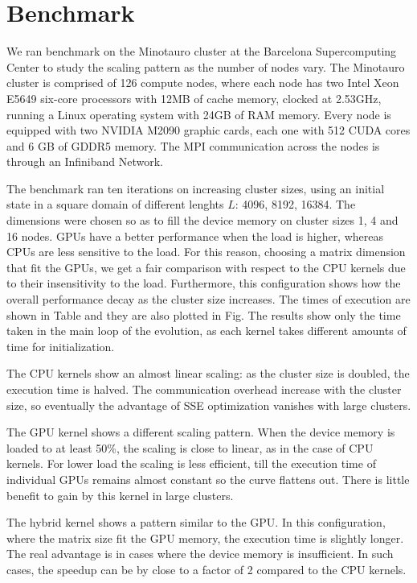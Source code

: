 \chapter{Benchmark}
We ran benchmark on the Minotauro cluster at the Barcelona Supercomputing Center to study the scaling pattern as the number of nodes vary. The Minotauro cluster is comprised of 126 compute nodes, where each node has two Intel Xeon E5649 six-core processors with 12MB of cache memory, clocked at 2.53GHz, running a Linux operating system with 24GB of RAM memory. Every node is equipped with two NVIDIA M2090 graphic cards, each one with 512 CUDA cores and 6 GB of GDDR5 memory. The MPI communication across the nodes is through an Infiniband Network. 

The benchmark ran ten iterations on increasing cluster sizes, using an initial state in a square domain of different lenghts $L$: 4096, 8192, 16384. The dimensions were chosen so as to fill the device memory on cluster sizes 1, 4 and 16 nodes. GPUs have a better performance when the load is higher, whereas CPUs are less sensitive to the load. For this reason, choosing a matrix dimension that fit the GPUs, we get a fair comparison with respect to the CPU kernels due to their insensitivity to the load. Furthermore, this configuration shows how the overall performance decay as the cluster size increases. The times of execution are shown in Table %
and they are also plotted in Fig. %
The results show only the time taken in the main loop of the evolution, as each kernel takes different amounts of time for initialization.

The CPU kernels show an almost linear scaling: as the cluster size is doubled, the execution time is halved. The communication overhead increase with the cluster size, so eventually the advantage of SSE optimization vanishes with large clusters.

The GPU kernel shows a different scaling pattern. When the device memory is loaded to at least 50\%, the scaling is close to linear, as in the case of CPU kernels. For lower load the scaling is less efficient, till the execution time of individual GPUs remains almost constant so the curve flattens out. There is little benefit to gain by this kernel in large clusters.

The hybrid kernel shows a pattern similar to the GPU. In this configuration, where the matrix size fit the GPU memory, the execution time is slightly longer. The real advantage is in cases where the device memory is insufficient. In such cases, the speedup can be by close to a factor of 2 compared to the CPU kernels.

